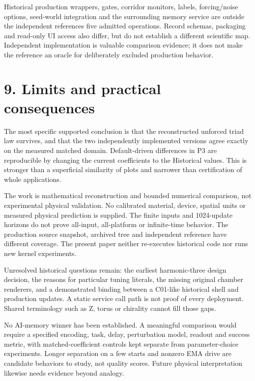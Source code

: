 \documentclass[
  11pt,
  a4paper,
]{article}
\begin{document}
Historical production wrappers, gates, corridor monitors, labels, forcing/noise options, seed-world integration and the surrounding memory service are outside the independent reference\textquotesingle s five admitted operations. Record schemas, packaging and read-only UI access also differ, but do not establish a different scientific map. Independent implementation is valuable comparison evidence; it does not make the reference an oracle for deliberately excluded production behavior.

\section{9. Limits and practical consequences}\label{limits-and-practical-consequences}

The most specific supported conclusion is that the reconstructed unforced triad law survives, and that the two independently implemented versions agree exactly on the measured matched domain. Default-driven differences in P3 are reproducible by changing the current coefficients to the Historical values. This is stronger than a superficial similarity of plots and narrower than certification of whole applications.

The work is mathematical reconstruction and bounded numerical comparison, not experimental physical validation. No calibrated material, device, spatial units or measured physical prediction is supplied. The finite inputs and 1024-update horizons do not prove all-input, all-platform or infinite-time behavior. The production source snapshot, archived tree and independent reference have different coverage. The present paper neither re-executes historical code nor runs new kernel experiments.

Unresolved historical questions remain: the earliest harmonic-three design decision, the reasons for particular tuning literals, the missing original chamber renderers, and a demonstrated binding between a C01-like historical shell and production updates. A static service call path is not proof of every deployment. Shared terminology such as Z, torus or chirality cannot fill those gaps.

No AI-memory winner has been established. A meaningful comparison would require a specified encoding, task, delay, perturbation model, readout and success metric, with matched-coefficient controls kept separate from parameter-choice experiments. Longer separation on a few starts and nonzero EMA drive are candidate behaviors to study, not quality scores. Future physical interpretation likewise needs evidence beyond analogy.
\end{document}
